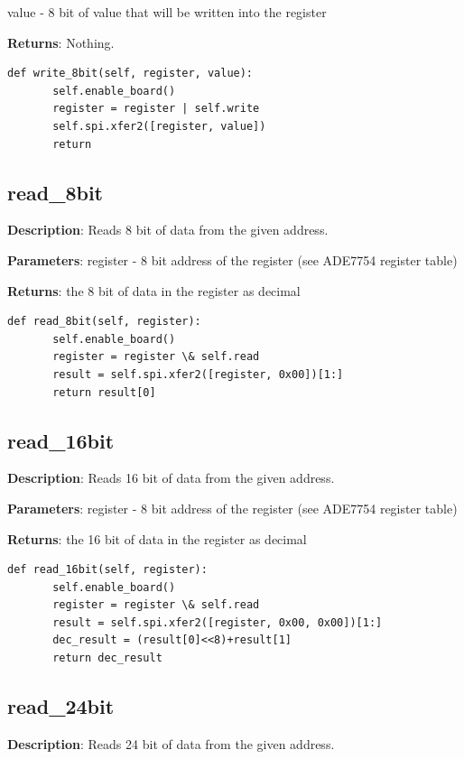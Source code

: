 \documentclass{scrartcl}  %
\begin{document}
					value - 8 bit of value that will be written into the register

\textbf{Returns}: Nothing.

\begin{lstlisting}
def write_8bit(self, register, value):
       self.enable_board()
       register = register | self.write
       self.spi.xfer2([register, value])
       return
\end{lstlisting}

\subsection{read_8bit}

\textbf{Description}: Reads 8 bit of data from the given address.

\textbf{Parameters}: register - 8 bit address of the register (see ADE7754 register table)

\textbf{Returns}: the 8 bit of data in the register as decimal

\begin{lstlisting}
def read_8bit(self, register):
       self.enable_board()
       register = register \& self.read
       result = self.spi.xfer2([register, 0x00])[1:]        
       return result[0]
\end{lstlisting}
 
\subsection{read_16bit}   

\textbf{Description}: Reads 16 bit of data from the given address.

\textbf{Parameters}: register - 8 bit address of the register (see ADE7754 register table)

\textbf{Returns}: the 16 bit of data in the register as decimal
  
\begin{lstlisting}
def read_16bit(self, register):
       self.enable_board()
       register = register \& self.read
       result = self.spi.xfer2([register, 0x00, 0x00])[1:]
       dec_result = (result[0]<<8)+result[1]
       return dec_result
\end{lstlisting}

\subsection{read_24bit}        

\textbf{Description}: Reads 24 bit of data from the given address.
\end{document}
